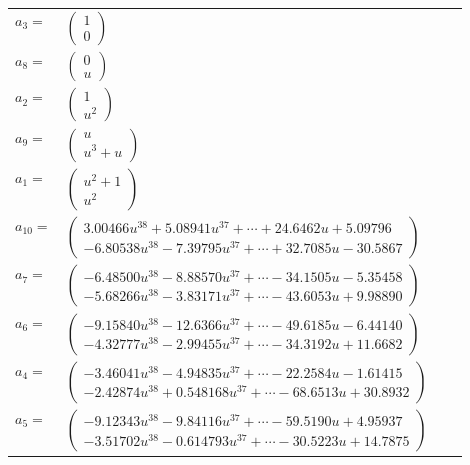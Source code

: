 \documentclass[1p]{elsarticle_modified}
\theoremstyle{definition}
\begin{document}
\begin{tabular}{m{7pt} m{180pt} m{7pt} m{180pt} }
\flushright $a_{3}=$&$\begin{pmatrix}1\\0\end{pmatrix}$ \\
\flushright $a_{8}=$&$\begin{pmatrix}0\\u\end{pmatrix}$ \\
\flushright $a_{2}=$&$\begin{pmatrix}1\\u^2\end{pmatrix}$ \\
\flushright $a_{9}=$&$\begin{pmatrix}u\\u^3+u\end{pmatrix}$ \\
\flushright $a_{1}=$&$\begin{pmatrix}u^2+1\\u^2\end{pmatrix}$ \\
\flushright $a_{10}=$&$\begin{pmatrix}3.00466 u^{38}+5.08941 u^{37}+\cdots+24.6462 u+5.09796\\-6.80538 u^{38}-7.39795 u^{37}+\cdots+32.7085 u-30.5867\end{pmatrix}$ \\
\flushright $a_{7}=$&$\begin{pmatrix}-6.48500 u^{38}-8.88570 u^{37}+\cdots-34.1505 u-5.35458\\-5.68266 u^{38}-3.83171 u^{37}+\cdots-43.6053 u+9.98890\end{pmatrix}$ \\
\flushright $a_{6}=$&$\begin{pmatrix}-9.15840 u^{38}-12.6366 u^{37}+\cdots-49.6185 u-6.44140\\-4.32777 u^{38}-2.99455 u^{37}+\cdots-34.3192 u+11.6682\end{pmatrix}$ \\
\flushright $a_{4}=$&$\begin{pmatrix}-3.46041 u^{38}-4.94835 u^{37}+\cdots-22.2584 u-1.61415\\-2.42874 u^{38}+0.548168 u^{37}+\cdots-68.6513 u+30.8932\end{pmatrix}$ \\
\flushright $a_{5}=$&$\begin{pmatrix}-9.12343 u^{38}-9.84116 u^{37}+\cdots-59.5190 u+4.95937\\-3.51702 u^{38}-0.614793 u^{37}+\cdots-30.5223 u+14.7875\end{pmatrix}$ \\

\end{tabular}
\end{document}
